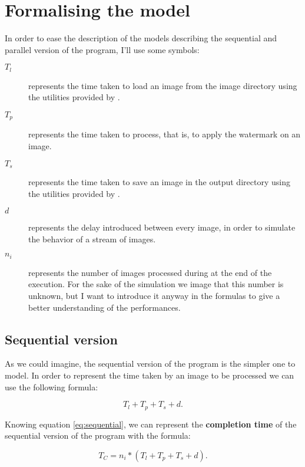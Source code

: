     \section{Formalising the model} %
    \label{sec:formalising_the_model}
        In order to ease the description of the models describing the sequential and parallel version of the
        program, I'll use some symbols:
        \begin{description}
            \item[$T_l$] represents the time taken to load an image from the image directory using the utilities
            provided by \cite{cimg}.
            \item[$T_p$] represents the time taken to process, that is, to apply the watermark on an image.
            \item[$T_s$] represents the time taken to save an image in the output directory using the utilities
            provided by \cite{cimg}.
            \item[$d$] represents the delay introduced between every image, in order to simulate the behavior of
            a stream of images.
            \item[$n_i$] represents the number of images processed during at the end of the execution. For the
            sake of the simulation we image that this number is unknown, but I want to introduce it anyway in the
            formulas to give a better understanding of the performances.
        \end{description}
        \subsection{Sequential version} %
        \label{sub:sequential_version}
            As we could imagine, the sequential version of the program is the simpler one to model. In order to
            represent the time taken by an image to be processed we can use the following formula:

            \begin{equation}
                T_l + T_p + T_s + d.
                \label{eq:sequential}
            \end{equation}

            Knowing equation \ref{eq:sequential}, we can represent the \textbf{completion time} of the sequential
            version of the program with the formula:

            \begin{equation}
                T_C = n_i * \left ( T_l + T_p + T_s + d \right ).
                \label{eq:completion_time_sequential}
            \end{equation}

